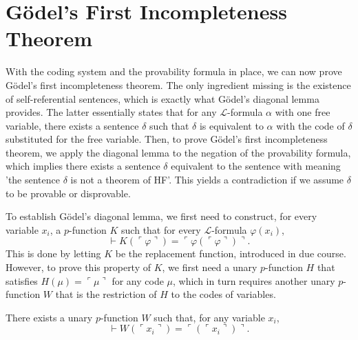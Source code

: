 \chapter{Gödel’s First Incompleteness Theorem}

With the coding system and the provability formula in place, 
we can now prove Gödel’s first incompleteness theorem.
The only ingredient missing is the existence of self-referential sentences, 
which is exactly what Gödel’s diagonal lemma provides.
The latter essentially states that for any $\mathcal{L}$-formula $\alpha$ with one free variable,
there exists a sentence $\delta$ such that $\delta$ is equivalent to $\alpha$ with the code
of $\delta$ substituted for the free variable.
Then, to prove Gödel’s first incompleteness theorem, we apply the diagonal lemma to the negation
of the provability formula, which implies there exists a sentence $\delta$ equivalent to the 
sentence with meaning 'the sentence $\delta$ is not a theorem of HF'.
This yields a contradiction if we assume $\delta$ to be provable or disprovable.

To establish Gödel’s diagonal lemma, we first need to construct, for every variable $x_i$, 
a $p$-function $K$ such that for every $\mathcal{L}$-formula $\varphi(x_i)$,
$$
\vdash K (\ulcorner{\varphi}\urcorner) = \ulcorner{\varphi(\ulcorner {\varphi} \urcorner)}\urcorner.
$$
This is done by letting $K$ be the replacement function, introduced in due course.
However, to prove this property of $K$, we first need a unary $p$-function $H$
that satisfies $H(\mu) = \ulcorner {\mu} \urcorner$ for any code $\mu$, which in turn requires
another unary $p$-function $W$ that is the restriction of $H$ to the codes of variables.

\begin{lemma}
    \label{lem:Code.exists_pFunc_forall_var_eq_code}
    There exists a unary $p$-function $W$ such that, for any variable $x_i$,
    $$
    \vdash W(\ulcorner{x_i}\urcorner) = \ulcorner{(\ulcorner{x_i}\urcorner)}\urcorner.
    $$
\end{lemma}

